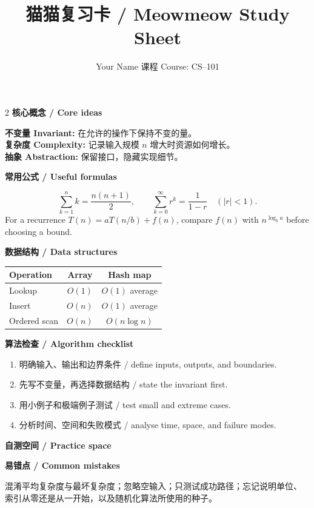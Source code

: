 \documentclass[UTF8,a4paper,9pt]{ctexart}
\title{猫猫复习卡 / Meowmeow Study Sheet}
\author{Your Name \quad 课程 Course: CS--101}
\date{}
\newcommand{\sectiontitle}[1]{\vspace{0.5em}\textcolor{purple!70!black}{\large\bfseries #1}\par\smallskip}
\begin{document}
\maketitle
\begin{multicols*}{2}
\sectiontitle{核心概念 / Core ideas}
\textbf{不变量 Invariant:} 在允许的操作下保持不变的量。\\
\textbf{复杂度 Complexity:} 记录输入规模 $n$ 增大时资源如何增长。\\
\textbf{抽象 Abstraction:} 保留接口，隐藏实现细节。

\sectiontitle{常用公式 / Useful formulas}
\[
 \sum_{k=1}^{n}k=\frac{n(n+1)}2,\qquad
 \sum_{k=0}^{\infty}r^k=\frac1{1-r}\quad(|r|<1).
\]
For a recurrence $T(n)=aT(n/b)+f(n)$, compare $f(n)$ with
$n^{\log_b a}$ before choosing a bound.

\sectiontitle{数据结构 / Data structures}
\begin{tabular}{@{}lcc@{}}
\toprule
Operation & Array & Hash map\\\midrule
Lookup & $O(1)$ & $O(1)$ average\\
Insert & $O(n)$ & $O(1)$ average\\
Ordered scan & $O(n)$ & $O(n\log n)$\\
\bottomrule
\end{tabular}

\sectiontitle{算法检查 / Algorithm checklist}
\begin{enumerate}
\item 明确输入、输出和边界条件 / define inputs, outputs, and boundaries.
\item 先写不变量，再选择数据结构 / state the invariant first.
\item 用小例子和极端例子测试 / test small and extreme cases.
\item 分析时间、空间和失败模式 / analyse time, space, and failure modes.
\end{enumerate}

\sectiontitle{自测空间 / Practice space}
\vspace{10cm}

\sectiontitle{易错点 / Common mistakes}
混淆平均复杂度与最坏复杂度；忽略空输入；只测试成功路径；忘记说明单位、
索引从零还是从一开始，以及随机化算法所使用的种子。
\end{multicols*}
\end{document}
